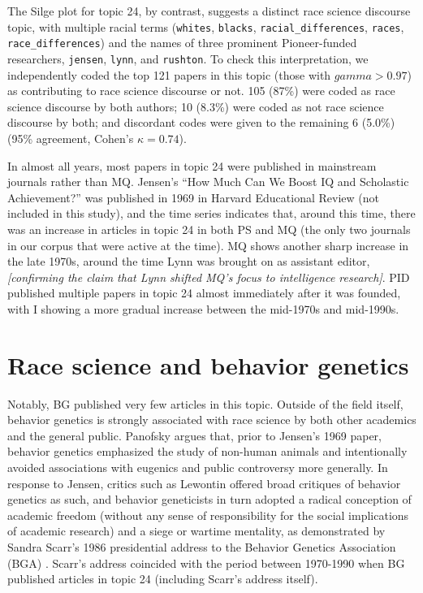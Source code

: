 \documentclass[12pt]{article}
\begin{document}
The Silge plot for topic 24, by contrast, suggests a distinct race science discourse topic, with multiple racial terms (\texttt{whites}, \texttt{blacks}, \texttt{racial\_differences}, \texttt{races}, \texttt{race\_differences}) and the names of three prominent Pioneer-funded researchers, \texttt{jensen}, \texttt{lynn}, and \texttt{rushton}. To check this interpretation, we independently coded the top 121 papers in this topic (those with \(gamma > 0.97\)) as contributing to race science discourse or not. 105 (87\%) were coded as race science discourse by both authors; 10 (8.3\%) were coded as not race science discourse by both; and discordant codes were given to the remaining 6 (5.0\%) (95\% agreement, Cohen's \(\kappa = 0.74\)).

In almost all years, most papers in topic 24 were published in mainstream journals rather than MQ. Jensen's ``How Much Can We Boost IQ and Scholastic Achievement?'' \cite{JensenHowMuchCan1969} was published in 1969 in Harvard Educational Review (not included in this study), and the time series indicates that, around this time, there was an increase in articles in topic 24 in both PS and MQ (the only two journals in our corpus that were active at the time). MQ shows another sharp increase in the late 1970s, around the time Lynn was brought on as assistant editor, \emph{{[}confirming the claim that Lynn shifted MQ's focus to intelligence research{]}}. PID published multiple papers in topic 24 almost immediately after it was founded, with I showing a more gradual increase between the mid-1970s and mid-1990s.

\hypertarget{race-science-and-behavior-genetics}{%
\section*{Race science and behavior genetics}\label{race-science-and-behavior-genetics}}

Notably, BG published very few articles in this topic. Outside of the field itself, behavior genetics is strongly associated with race science by both other academics and the general public. Panofsky \cite{PanofskyMisbehavingScienceControversy2014} argues that, prior to Jensen's 1969 paper, behavior genetics emphasized the study of non-human animals and intentionally avoided associations with eugenics and public controversy more generally. In response to Jensen, critics such as Lewontin offered broad critiques of behavior genetics as such, and behavior geneticists in turn adopted a radical conception of academic freedom (without any sense of responsibility for the social implications of academic research) and a siege or wartime mentality, as demonstrated by Sandra Scarr's 1986 presidential address to the Behavior Genetics Association (BGA) \cite{ScarrThreeCheersBehavior1987}. Scarr's address coincided with the period between 1970-1990 when BG published articles in topic 24 (including Scarr's address itself).
\end{document}
